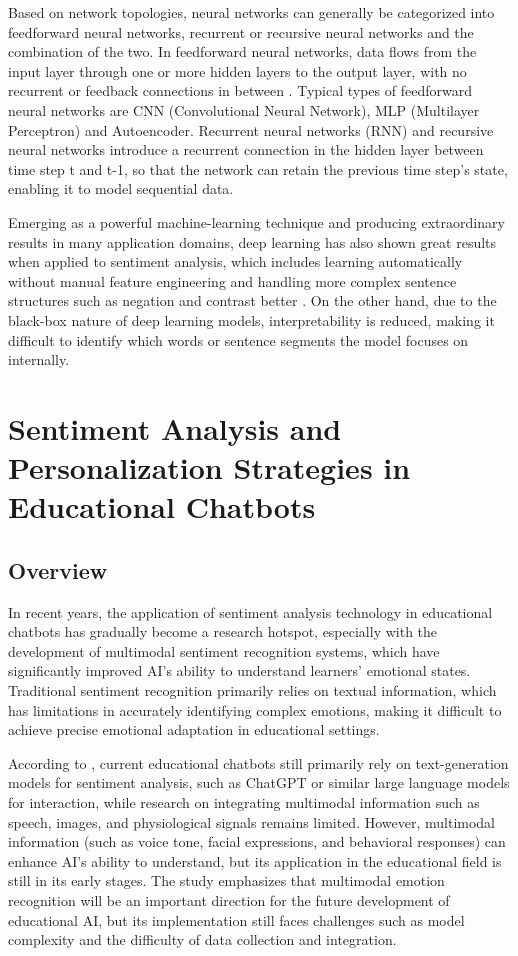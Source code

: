 \documentclass{xum_review}
\begin{document}
Based on network topologies, neural networks can generally be categorized into
feedforward neural networks, recurrent or recursive neural networks and the
combination of the two. In feedforward neural networks, data flows from the
input layer through one or more hidden layers to the output layer, with no
recurrent or feedback connections in between \citep{heaton-2017}. Typical types of
feedforward neural networks are CNN (Convolutional Neural Network), MLP
(Multilayer Perceptron) and Autoencoder. Recurrent neural networks (RNN) and
recursive neural networks introduce a recurrent connection in the hidden layer
between time step t and t-1, so that the network can retain the previous time
step's state, enabling it to model sequential data. 

Emerging as a powerful machine-learning technique and producing extraordinary
results in many application domains, deep learning has also shown great results
when applied to sentiment analysis, which includes learning automatically
without manual feature engineering and handling more complex sentence structures
such as negation and contrast better \citep{yang2016hierarchical}. On the other hand, due
to the black-box nature of deep learning models, interpretability is reduced,
making it difficult to identify which words or sentence segments the model
focuses on internally.

\section{Sentiment Analysis and Personalization Strategies in Educational Chatbots}

\subsection{Overview}
In recent years, the application of sentiment analysis technology in educational
chatbots has gradually become a research hotspot, especially with the
development of multimodal sentiment recognition systems, which have
significantly improved AI's ability to understand learners' emotional states.
Traditional sentiment recognition primarily relies on textual information, which
has limitations in accurately identifying complex emotions, making it difficult
to achieve precise emotional adaptation in educational settings. 

According to \citet{heilala2024overview}, current educational
chatbots still primarily rely on text-generation models for sentiment analysis,
such as ChatGPT or similar large language models for interaction, while research
on integrating multimodal information such as speech, images, and physiological
signals remains limited. However, multimodal information (such as voice tone,
facial expressions, and behavioral responses) can enhance AI's ability to
understand, but its application in the educational field is still in its early
stages. The study emphasizes that multimodal emotion recognition will be an
important direction for the future development of educational AI, but its
implementation still faces challenges such as model complexity and the
difficulty of data collection and integration. 
\end{document}
